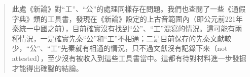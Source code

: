 \begin{quote}
%
%

此處《新論》對``工''、``公''的處理同樣存在問題。我們也查閱了一些《通假字典》類的工具書，發現在《新論》設定的上古音範圍內（即公元前221年秦統一中國之前），目前確實沒有找到``公''、``工''混寫的情況。這可能有兩種情況，一是確實先秦``公''和``工''不相通；二是目前保存的先秦文獻較少，``公''、``工''先秦就有相通的情況，只不過文獻沒有記錄下來（not attested），至少沒有被收入到這些工具書當中。這都有待對材料進一步發掘才能得出確鑿的結論。 \\


\end{quote}
